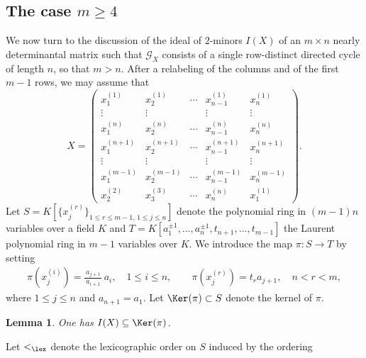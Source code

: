 \documentclass[12pt]{amsart}
\numberwithin{equation}{section}
\let\to=\rightarrow
\newtheorem{Lemma}[Theorem]{Lemma}
\begin{document}
\subsection{The case $m\geq 4$}\label{sec:m=4} We now turn to the discussion of the ideal of $2$-minors $I(X)$ of an $m\times n$ nearly determinantal matrix such that
$\mathcal G_X$ consists of a single row-distinct directed
cycle of length $n$, so that $m>n$. After a relabeling
of the columns and of the first $m-1$ rows, we may
assume that
\[
X=
\begin{pmatrix}
x_{1}^{(1)} & x_{2}^{(1)} & \cdots & x_{n-1}^{(1)} & x_{n}^{(1)} \\
\vdots & \vdots &       & \vdots & \vdots\\
x_{1}^{(n)} & x_{2}^{(n)} & \cdots & x_{n-1}^{(n)} & x_{n}^{(n)}\\
x_{1}^{(n+1)} & x_{2}^{(n+1)} & \cdots & x_{n-1}^{(n+1)} & x_{n}^{(n+1)} \\
\vdots & \vdots &       & \vdots & \vdots\\
x_{1}^{(m-1)} & x_{2}^{(m-1)} & \cdots & x_{n-1}^{(m-1)} & x_{n}^{(m-1)}\\
x_2^{(2)} & x_3^{(3)} & \cdots & x_{n}^{(n)} & x_1^{(1)}
\end{pmatrix}.
\]
Let $S=K[\{x_j^{(r)}\}_{1 \leq r\leq m-1, \, 1\leq j \leq n}]$ denote the polynomial ring in $(m-1)n$ variables over a field $K$ and $T=K[a_1^{\pm 1}, \ldots, a_n^{\pm 1}, t_{n+1}, \ldots, t_{m-1}]$ the Laurent polynomial ring in $m-1$ variables over $K$.  We introduce the map $\pi : S \to T$ by setting
\begin{eqnarray}
\label{abcdefg}   
\pi(x_j^{(i)})= \frac{\,a_{j+1}\,}{a_{i+1}} \, a_{i}, \quad 1 \leq i \leq n,
\qquad \pi(x_j^{(r)}) = t_ra_{j+1}, \quad n < r < m,
\end{eqnarray}
where $1 \leq j \leq n$ and $a_{n+1} = a_1$.  Let $\Ker(\pi) \subset S$ denote the kernel of $\pi$. 

\begin{Lemma}
    One has $I(X) \subseteq \Ker(\pi)$.
\end{Lemma}

Let $<_{\lex}$ denote the lexicographic order on $S$ induced by the ordering
\end{document}
